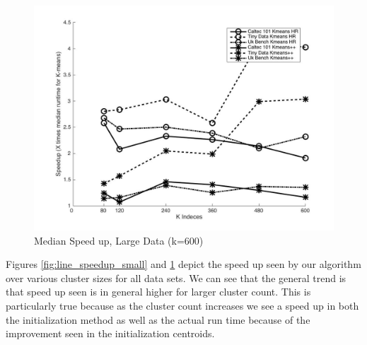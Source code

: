 \begin{figure}[h!]
    \centering
        \includegraphics[width=\textwidth, height = 0.5\textheight, scale=1]{Chapter-5/figs/k_means_speedup_line_large}
    \caption{Median Speed up, Large Data (k=600)}
    \label{fig:line_speedup_large}
\end{figure}

Figures \ref{fig:line_speedup_small} and \ref{fig:line_speedup_large} depict the speed up seen by our algorithm over various cluster sizes for all data sets. We can see that the general trend is that speed up seen is in general higher for larger cluster count. This is particularly true because as the cluster count increases we see a speed up in both the initialization method as well as the actual run time because of the improvement seen in the initialization centroids.

